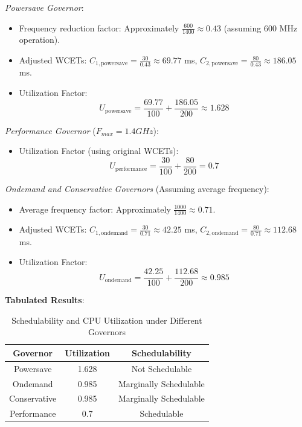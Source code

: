 \documentclass[conference]{IEEEtran}
\begin{document}
\textit{Powersave Governor}:
\begin{itemize}
    \item Frequency reduction factor: Approximately \( \frac{600}{1400} \approx 0.43 \) (assuming 600 MHz operation).
    \item Adjusted WCETs: \( C_{1,\text{powersave}} = \frac{30}{0.43} \approx 69.77 \) ms, \( C_{2,\text{powersave}} = \frac{80}{0.43} \approx 186.05 \) ms.
    \item Utilization Factor: 
     \begin{equation}
     U_{\text{powersave}} = \frac{69.77}{100} + \frac{186.05}{200} \approx 1.628
     \end{equation}
\end{itemize}

\textit{Performance Governor} ($F_{max} = 1.4 GHz$):
\begin{itemize}
    \item Utilization Factor (using original WCETs):
     \begin{equation}
     U_{\text{performance}} = \frac{30}{100} + \frac{80}{200} = 0.7
     \end{equation}
\end{itemize}

\textit{Ondemand and Conservative Governors} (Assuming average frequency):
\begin{itemize}
    \item Average frequency factor: Approximately \( \frac{1000}{1400} \approx 0.71 \).
    \item Adjusted WCETs: \( C_{1,\text{ondemand}} = \frac{30}{0.71} \approx 42.25 \) ms, \( C_{2,\text{ondemand}} = \frac{80}{0.71} \approx 112.68 \) ms.
    \item Utilization Factor:
     \begin{equation}
     U_{\text{ondemand}} = \frac{42.25}{100} + \frac{112.68}{200} \approx 0.985
     \end{equation}
\end{itemize}

\textbf{Tabulated Results}:
\begin{table}[h!]
\centering
\begin{tabular}{|c|c|c|}
\hline
\textbf{Governor} & \textbf{Utilization} & \textbf{Schedulability} \\
\hline
Powersave & 1.628 & Not Schedulable \\
Ondemand & 0.985 & Marginally Schedulable \\
Conservative & 0.985 & Marginally Schedulable \\
Performance & 0.7 & Schedulable \\
\hline
\end{tabular}
\label{tab:schedulability_governors}
\caption{Schedulability and CPU Utilization under Different Governors}
\end{table}
\end{document}
